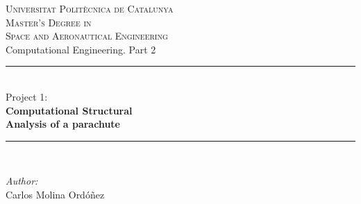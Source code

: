 
\begin{titlepage}

\newcommand{\HRule}{\rule{\linewidth}{0.5mm}} %

\center %


\textsc{\LARGE Universitat Politècnica de Catalunya}\\[0.5cm]
\textsc{\Large Master's Degree in\\ Space and Aeronautical Engineering}\\[1.8cm]

\Large Computational Engineering. Part 2\\





\HRule \\[0.2cm]
\Large Project 1:\\[0.5cm]
{ \Large \bfseries
Computational Structural \\[0cm]
Analysis of a parachute\\[0cm]
}
\HRule \\[3.5cm]


\begin{minipage}{0.4\textwidth}
\begin{flushleft} \large
\emph{Author:}\\
{ \normalsize
Carlos Molina Ordóñez\\
}
\end{flushleft}
\end{minipage}
~
\begin{minipage}{0.4\textwidth}
\end{minipage}\\[2cm]


\end{titlepage}
